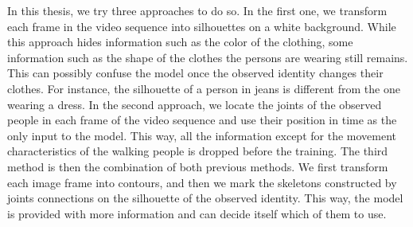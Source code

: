 In this thesis, we try three approaches to do so. In the first one, we transform each frame in the video sequence into silhouettes on a white background. While this approach hides information such as the color of the clothing, some information such as the shape of the clothes the persons are wearing still remains. This can possibly confuse the model once the observed identity changes their clothes. For instance, the silhouette of a person in jeans is different from the one wearing a dress. In the second approach, we locate the joints of the observed people in each frame of the video sequence and use their position in time as the only input to the model. This way, all the information except for the movement characteristics of the walking people is dropped before the training. The third method is then the combination of both previous methods. We first transform each image frame into contours, and then we mark the skeletons constructed by joints connections on the silhouette of the observed identity. This way, the model is provided with more information and can decide itself which of them to use.